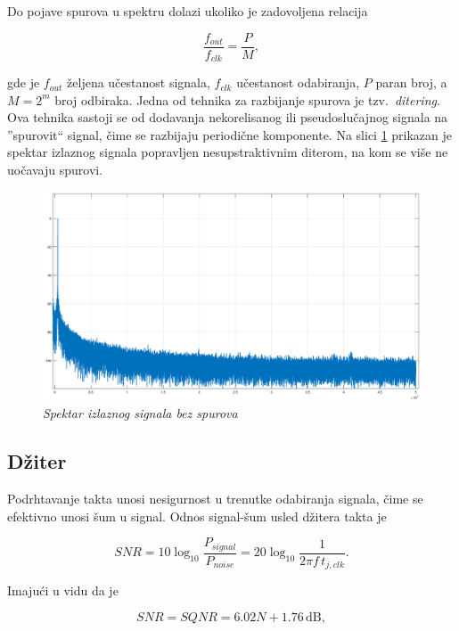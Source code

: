 \documentclass[conference]{IEEEtran}
\begin{document}
Do pojave spurova u spektru dolazi ukoliko je zadovoljena relacija 

\begin{equation}\label{eq:spur}
	\frac{f_{out}}{f_{clk}} = \frac{P}{M} ,
\end{equation}

\noindent gde je $f_{out}$ željena učestanost signala, $f_{clk}$ učestanost odabiranja, $P$ paran broj, a $M=2^m$ broj odbiraka. Jedna od tehnika za razbijanje spurova je tzv.~\textsl{ditering}. Ova tehnika sastoji se od dodavanja nekorelisanog ili pseudoslučajnog signala na ''spurovit`` signal, čime se razbijaju periodične komponente. Na slici \ref{slika:nospur} prikazan je spektar izlaznog signala popravljen nesupstraktivnim diterom, na kom se više ne uočavaju spurovi.

\begin{figure}[h]
	\centering
	\includegraphics[scale=0.15]{./slike/nospur.eps}
	\caption{\textsl{Spektar izlaznog signala bez spurova}}
	\label{slika:nospur}
\end{figure}

\subsection{Džiter}
Podrhtavanje takta unosi nesigurnost u trenutke odabiranja signala, čime se efektivno unosi šum u signal. Odnos signal-šum usled džitera takta je 

\begin{equation}
SNR = 10\log_{10}\frac{P_{signal}}{P_{noise}}=20\log_{10}\frac{1}{2\pi f\,t_{j,clk}} .
\end{equation}

Imajući u vidu da je 

\begin{equation}
SNR = SQNR = 6.02N + 1.76\, \text{dB} ,
\end{equation}
\end{document}
